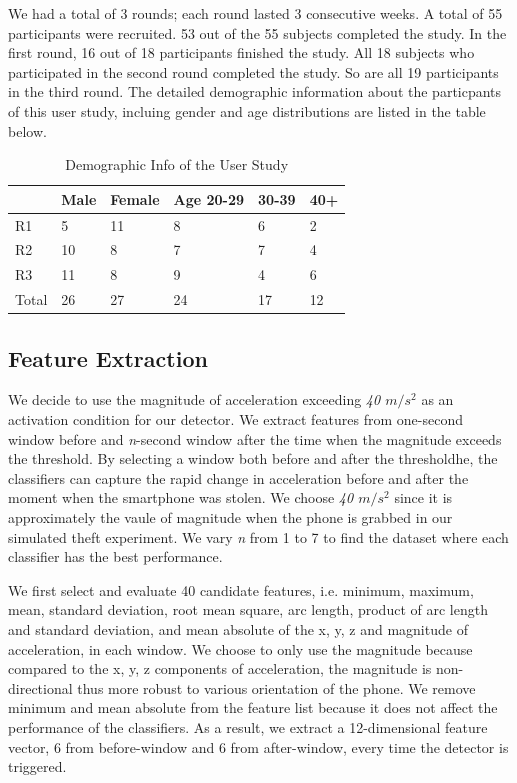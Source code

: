 \documentclass{soups}
\begin{document}
We had a total of 3 rounds; each round lasted 3 consecutive weeks. A total of 55 participants were recruited. 53 out of the 55 subjects completed the study. In the first round, 16 out of 18 participants finished the study. All 18 subjects who participated in the second round completed the study. So are all 19 participants in the third round. The detailed
demographic information about the particpants of this user study, incluing gender and age distributions are listed in the table below.

\begin{table}[H]
\centering
\begin{tabular}{llllll}
\hline
      & Male & Female & Age 20-29 & 30-39 & 40+ \\ \hline
R1    & 5    & 11     & 8         & 6     & 2   \\
R2    & 10   & 8      & 7         & 7     & 4   \\
R3    & 11   & 8      & 9         & 4     & 6   \\
Total & 26   & 27     & 24        & 17    & 12  \\ \hline
\end{tabular}
\caption{Demographic Info of the User Study}
\label{my-label}
\end{table}




\subsection{Feature Extraction}

We decide to use the magnitude of acceleration exceeding \textit{40 $m/s^2$} as an activation condition for our detector. We extract features from one-second window before and \textit{n}-second window after the time when the magnitude exceeds the threshold. By selecting a window both before and after the thresholdhe, the classifiers can capture the rapid change in acceleration before and after the moment when the smartphone was stolen. We choose \textit{40 $m/s^2$} since it is approximately the vaule of magnitude when the phone is grabbed in our simulated theft experiment. We vary \textit{n} from 1 to 7 to find the dataset where each classifier has the best performance.

We first select and evaluate 40 candidate features, i.e. minimum, maximum, mean, standard deviation, root mean square, arc length, product of arc length and standard deviation, and mean absolute of the x, y, z and magnitude of acceleration, in each window. We choose to only use the magnitude because compared to the x, y, z components of acceleration, the magnitude is non-directional thus more robust to various orientation of the phone. We remove minimum and mean absolute from the feature list because it does not affect the performance of the classifiers. As a result, we extract a 12-dimensional feature vector, 6 from before-window and 6 from after-window, every time the detector is triggered.
\end{document}
